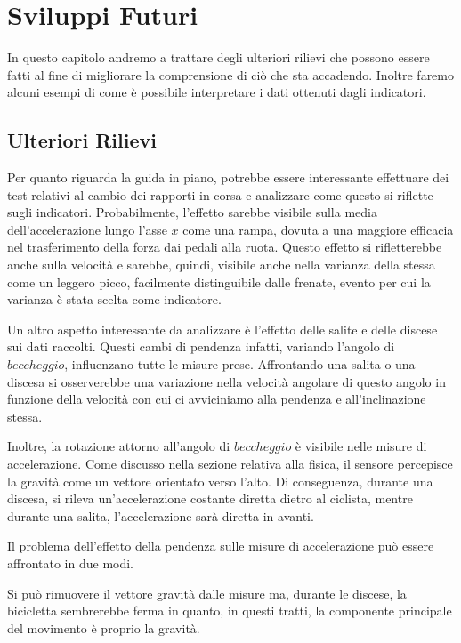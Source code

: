 \documentclass[class=article]{standalone}
\begin{document}
	\section{Sviluppi Futuri}
	In questo capitolo andremo a trattare degli ulteriori rilievi che possono essere fatti al fine di migliorare la comprensione di ciò che sta accadendo. Inoltre faremo alcuni esempi di come è possibile interpretare i dati ottenuti dagli indicatori.
	
	\subsection{Ulteriori Rilievi}
	Per quanto riguarda la guida in piano, potrebbe essere interessante effettuare dei test relativi al cambio dei rapporti in corsa e analizzare come questo si riflette sugli indicatori. Probabilmente, l'effetto sarebbe visibile sulla media dell'accelerazione lungo l'asse \(x\) come una rampa, dovuta a una maggiore efficacia nel trasferimento della forza dai pedali alla ruota. Questo effetto si rifletterebbe anche sulla velocità e sarebbe, quindi, visibile anche nella varianza della stessa come un leggero picco, facilmente distinguibile dalle frenate, evento per cui la varianza è stata scelta come indicatore.\hfill\break
	
	Un altro aspetto interessante da analizzare è l'effetto delle salite e delle discese sui dati raccolti. Questi cambi di pendenza infatti, variando l'angolo di \(beccheggio\), influenzano tutte le misure prese. Affrontando una salita o una discesa si osserverebbe una variazione nella velocità angolare di questo angolo in funzione della velocità con cui ci avviciniamo alla pendenza e all'inclinazione stessa.
	
	Inoltre, la rotazione attorno all'angolo di \(beccheggio\) è visibile nelle misure di accelerazione. Come discusso nella sezione relativa alla fisica, il sensore percepisce la gravità come un vettore orientato verso l'alto. Di conseguenza, durante una discesa, si rileva un'accelerazione costante diretta dietro al ciclista, mentre durante una salita, l'accelerazione sarà diretta in avanti.\hfill\break
	
	Il problema dell'effetto della pendenza sulle misure di accelerazione può essere affrontato in due modi.
	
	Si può rimuovere il vettore gravità dalle misure ma, durante le discese, la bicicletta sembrerebbe ferma in quanto, in questi tratti, la componente principale del movimento è proprio la gravità.
	
\end{document}
